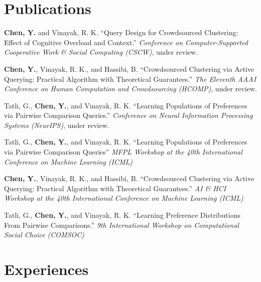 \documentclass[11pt,letterpaper]{report}
\begin{document}
    \section*{Publications}
    
    \begin{tablist}

        \item[2023] \tab{}\textbf{Chen, Y.} and Vinayak, R. K. \enquote{Query Design for Crowdsourced Clustering: Effect of Cognitive Overload and Context.} \textit{Conference on Computer-Supported Cooperative Work \& Social Computing (CSCW)}, under review.

        \item[2023] \tab{}\textbf{Chen, Y.}, Vinayak, R. K., and Hassibi, B. \enquote{Crowdsourced Clustering via Active Querying: Practical Algorithm with Theoretical Guarantees.} \textit{The Eleventh AAAI Conference on Human Computation and Crowdsourcing (HCOMP)}, under review.

        \item[2023] \tab{}Tatli, G., \textbf{Chen, Y.}, and Vinayak, R. K. \enquote{Learning Populations of Preferences via Pairwise Comparison Queries.} \textit{Conference on Neural Information Processing Systems (NeurIPS)}, under review.

        \item[2023] \tab{}Tatli, G., \textbf{Chen, Y.}, and Vinayak, R. K. \enquote{Learning Populations of Preferences via Pairwise Comparison Queries} \textit{MFPL Workshop at the 40th International Conference on Machine Learning (ICML)}

        \item[2023] \tab{}\textbf{Chen, Y.}, Vinayak, R. K., and Hassibi, B. \enquote{Crowdsourced Clustering via Active Querying: Practical Algorithm with Theoretical Guarantees.} \textit{AI \& HCI Workshop at the 40th International Conference on Machine Learning (ICML)}

        \item[2023] \tab{}Tatli, G., \textbf{Chen, Y.}, and Vinayak, R. K. \enquote{Learning Preference Distributions From Pairwise Comparisons.} \textit{9th International Workshop on Computational Social Choice (COMSOC)}

    \end{tablist}

    \section*{Experiences}
\end{document}

